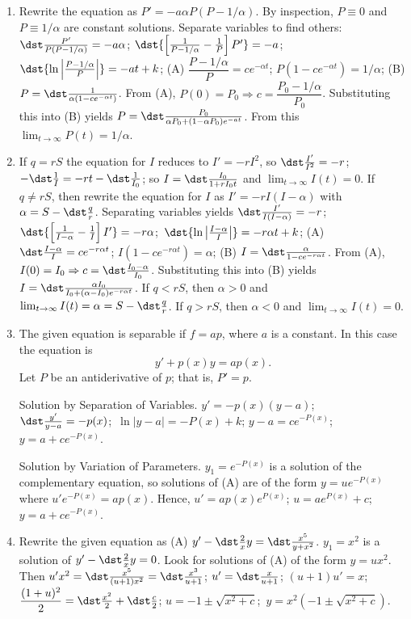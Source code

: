 \documentclass[openany]{book}
\newenvironment{sectionSolutions}{
 \begin{enumerate}[item-label={\thesection.\arabic{enumi}.}]
}{
 \end{enumerate}
}
\begin{document}
\begin{sectionSolutions}
\item
Rewrite the equation as $P'=-a\alpha P(P-1/\alpha)$.
By inspection, $P\equiv0$ and $P\equiv1/\alpha$ are constant
solutions.
Separate variables to find others: $\dst\frac{P'}{
P(P-1/\alpha)}=-a\alpha$;\;
 $\dst{\left[\frac{1}{ P-1/\alpha}-\frac{1}{ P}\right]P'}=-a
$;\ $\dst{\ln\left|\frac{P-1/\alpha}{ P}\right|}=-at+k$;\;
(A) $\dfrac{P-1/\alpha}{
P}=ce^{-\alpha t}$; $P(1-ce^{-\alpha t})=1/\alpha$;\;
(B) $P=\dst\frac{1}{\alpha(1-ce^{-\alpha t})}$. From (A),
 $P(0)=P_0\Rightarrow c=\dfrac{P_0-1/\alpha}{ P_0}$.
Substituting this into (B) yields
$P=\dst\frac{P_0}{\alpha
P_0+(1-\alpha P_0)e^{-at}}$. From this
$\lim_{t\to\infty}P(t)=1/\alpha$.


\item
If $q=rS$ the equation for $I$ reduces to $I'=-rI^2$, so
$\dst\frac{I'}{ I^2}=-r$; $-\dst\frac{1}{ I}=-rt-\dst\frac{1}{ I_0}$;
so $I=\dst\frac{I_0}{1+rI_0t}$ and $\lim_{t\to\infty}I(t)=0$. If $q\ne
rS$, then rewrite the equation for $I$ as $I'=-rI(I-\alpha)$ with
$\alpha=S-\dst\frac{q}{ r}$. Separating variables yields
$\dst\frac{I'}{ I(I-\alpha)}=-r$;\;
 $\dst{\left[\frac{1}{ I-\alpha}-\frac{1}{ I}\right]I'}=-r\alpha
$;\ $\dst{\ln\left|\frac{I-\alpha}{ I}\right|}=-r\alpha t+k$;\;
(A) $\dst\frac{I-\alpha}{
I}=ce^{-r\alpha t}$; $I(1-ce^{-r\alpha t})=\alpha$;\;
(B) $I=\dst\frac{\alpha}{ 1-ce^{-r\alpha t}}$. From (A),
 $I(0)=I_0\Rightarrow c=\dst\frac{I_0-\alpha}{ I_0}$.
Substituting this into (B) yields
$I=\dst\frac{\alpha I_0}{ I_0+(\alpha-I_0)e^{-r\alpha t}}$.
If $q<rS$, then $\alpha>0$ and
$\lim_{t\to\infty}I(t)=\alpha=S-\dst\frac{q}{ r}$.
If $q>rS$, then $\alpha<0$ and $\lim_{t\to\infty}I(t)=0$.

\addtocounter{enumi}{2}
\item%
The given equation is separable if $f=ap$, where $a$ is a constant.
In this case the equation is
\[
y'+p(x)y=ap(x).
\tag{A}
\]
Let $P$ be an antiderivative  of $p$; that is, $P'=p$.

{\sc Solution by Separation of Variables.} $y'=-p(x)(y-a)$;\;
$\dst\frac{y'}{ y-a}=-p(x)$;\ $\ln|y-a|=-P(x)+k$;\;
$y-a=ce^{-P(x)}$;\ $y=a+ce^{-P(x)}$.

{\sc Solution by Variation of Parameters.} $y_1=e^{-P(x)}$
is a solution of the complementary equation, so solutions of
(A) are of the form $y=ue^{-P(x)}$ where
$u'e^{-P(x)}=ap(x)$. Hence, $u'=ap(x)e^{P(x)}$;\;
$u=ae^{P(x)}+c$;\ $y=a+ce^{-P(x)}$.


\item Rewrite the given equation as
(A) $y'-\dst\frac{2}{ x}y=\dst\frac{x^5}{ y+x^2}$.
 $y_1=x^2$ is a solution of $y'-\dst\frac{2}{ x}y=0$.
Look for solutions of (A)  of the form $y=ux^2$.
Then $u'x^2=\dst\frac{x^5}{(u+1)x^2}=\dst\frac{x^3}{ u+1}$;\;
$u'=\dst\frac{x}{ u+1}$;\;
$(u+1)u'=x$;\;
$\dfrac{(1+u)^2}{2}=\dst\frac{x^2}{2}+\dst\frac{c}{2}$;\;
$u=-1\pm\sqrt{x^2+c}$;\ $y=x^2\left(-1\pm\sqrt{x^2+c}\right)$.



\end{sectionSolutions}
\end{document}
